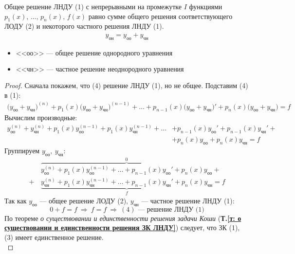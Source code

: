 \begin{theorem}
    Общее решение ЛНДУ (1) с непрерывными на промежутке $I$ функциями\break $p_1(x),\, \ldots,\, p_n(x),\, f(x)$ равно сумме общего решения соответствующего ЛОДУ (2) и некоторого частного решения ЛНДУ (1).
    \begin{gather}
        \boxed{y_{\text{он}} = y_{\text{оо}} + y_{\text{чн}}}
    \end{gather}
    \begin{itemize}
        \item <<оо>> --- общее решение однородного уравнения
        \item <<чн>> --- частное решение неоднородного уравнения
    \end{itemize}
\end{theorem}
\begin{proof}
    Сначала покажем, что (4) решение ЛНДУ (1), но не общее.
    Подставим (4) в (1):
    \begin{align*}
        \big(y_{\text{оо}} + y_{\text{чн}}\big)^{(n)} + p_1(x) \big(y_{\text{оо}} + y_{\text{чн}}\big)^{(n-1)} + \ldots + p_{n-1}(x) \big(y_{\text{оо}} + y_{\text{чн}}\big)' + p_n(x) \big(y_{\text{оо}} + y_{\text{чн}}\big) = f
    \end{align*}
    Вычислим производные:
    \begin{align*}
        y_{\text{оо}}^{(n)} + y_{\text{чн}}^{(n)} + p_1(x)y_{\text{оо}}^{(n-1)} + p_1(x) y_{\text{чн}}^{(n-1)} + \ldots &+ p_{n-1}(x)y_{\text{оо}}' + p_{n-1}(x) y_{\text{чн}}' + \\ 
        &+ p_{n}(x)y_{\text{оо}} + p_{n}(x) y_{\text{чн}} = f
    \end{align*}
    Группируем $y_{\text{оо}},\ y_{\text{чн}}\colon$
    \begin{align*}
        &\overbrace{y_{\text{оо}}^{(n)} + p_1(x)y_{\text{оо}}^{(n-1)} + \ldots + p_{n-1}(x)y_{\text{оо}}' + p_{n}(x)y_{\text{оо}}}^0 + \\ 
        +\, &\underbrace{y_{\text{чн}}^{(n)} + p_1(x) y_{\text{чн}}^{(n-1)} + \ldots  + p_{n-1}(x) y_{\text{чн}}' + p_{n}(x) y_{\text{чн}}}_f = f
    \end{align*}
    Так как $y_{\text{оо}}$ --- общее решение ЛОДУ (2), $y_{\text{чн}}$ --- частное решение ЛНДУ (1):
    \[
    0 + f = f\ \Rightarrow\ f = f\ \Rightarrow\ (4) \text{ --- решение ЛНДУ (1)}
    \]
    По теореме \textit{о существовании и единственности решения задачи Коши} (\textbf{Т.\ref{т: о существовании и единственности решения ЗК ЛНДУ}}) следует, что ЗК (1), (3) имеет единственное решение.\\[1ex]

\end{proof}
